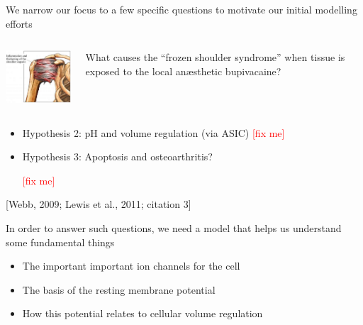 \documentclass[ignorenonframetext]{beamer}
\newcommand{\references}[1] {
  \begin{flushright}
    \scriptsize [#1] \normalsize
  \end{flushright}
}
\newcommand{\fixme} {
  \scriptsize
  \textcolor{red}{[fix me]}
  \normalsize
}
\begin{document}
\begin{frame}{We narrow our focus to a few specific questions to
    motivate our initial modelling efforts}

  \begin{columns}
    \begin{column}{6cm}
      \begin{center}
        \includegraphics[width=4cm]{../images/pdf/frozen-shoulder}
      \end{center}
    \end{column}
    \begin{column}{6cm}
      What causes the ``frozen shoulder syndrome''
      when tissue is exposed to the local an\ae{}sthetic
      bupivacaine?
    \end{column}
  \end{columns}

  \vspace{0.5cm}

  \begin{itemize}
    \pause
  \item<2-> Hypothesis 2: pH and volume regulation (via ASIC) \fixme
  \item<2-> Hypothesis 3: Apoptosis and osteoarthritis?
    \fixme
  \end{itemize}
  \references{Webb, 2009; Lewis et al., 2011; citation 3}

\end{frame}

\begin{frame}{In order to answer such questions, we need a model that
    helps us understand some fundamental things}
  \begin{itemize}
  \item The important important ion channels for the cell\\[0.5cm]
  \item The basis of the resting membrane potential\\[0.5cm]
  \item How this potential relates to cellular volume regulation\\[0.5cm]
  \end{itemize}
\end{frame}
\end{document}
